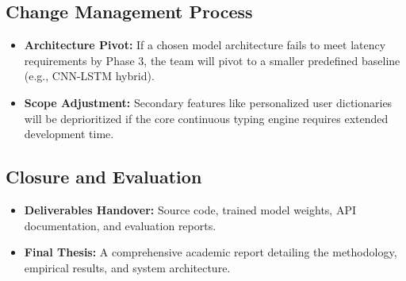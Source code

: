 \subsection{Change Management Process}
\begin{itemize}
    \item \textbf{Architecture Pivot:} If a chosen model architecture fails to meet latency requirements by Phase 3, the team will pivot to a smaller predefined baseline (e.g., CNN-LSTM hybrid).
    \item \textbf{Scope Adjustment:} Secondary features like personalized user dictionaries will be deprioritized if the core continuous typing engine requires extended development time.
\end{itemize}

\subsection{Closure and Evaluation}
\begin{itemize}
    \item \textbf{Deliverables Handover:} Source code, trained model weights, API documentation, and evaluation reports.
    \item \textbf{Final Thesis:} A comprehensive academic report detailing the methodology, empirical results, and system architecture.
\end{itemize}
